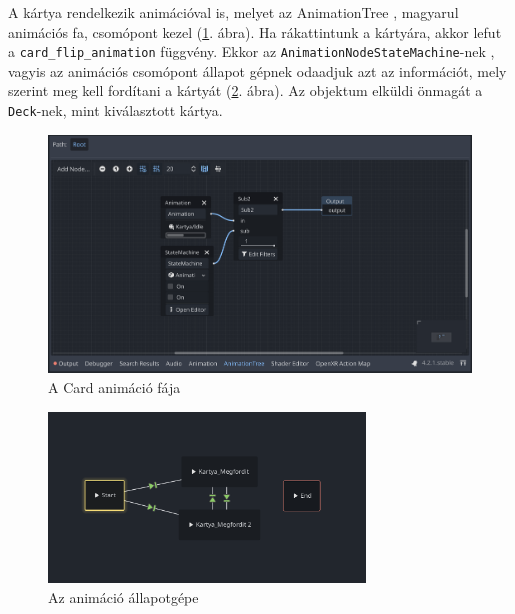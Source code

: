 A kártya rendelkezik animációval is, melyet az AnimationTree \cite{Animatio38:online}, magyarul animációs fa, csomópont kezel (\ref{img:animation_tree}. ábra). 
Ha rákattintunk a kártyára, akkor lefut a \lstinline|card_flip_animation| függvény. Ekkor az \lstinline|AnimationNodeStateMachine|-nek \cite{Animatio50:online}, vagyis az animációs csomópont állapot gépnek odaadjuk azt az információt, mely szerint meg kell fordítani a kártyát (\ref{img:state_machine}. ábra).
Az objektum elküldi önmagát a \lstinline|Deck|-nek, mint kiválasztott kártya. 
\begin{figure}[h]
    \centering
    \includegraphics[width=\textwidth]{img/animation_tree.png}
    \caption{A Card animáció fája}
    \label{img:animation_tree}  
\end{figure}

\begin{figure}[h]
    \centering
    \includegraphics[width=0.75\textwidth]{img/allapotgep.png}
    \caption{Az animáció állapotgépe}
    \label{img:state_machine}  
\end{figure}



